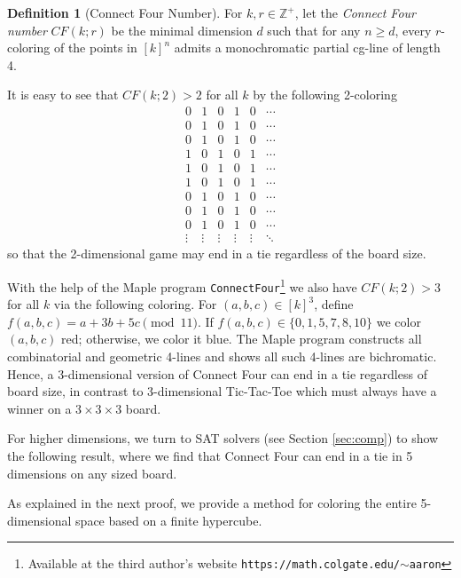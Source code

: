 \documentclass[11pt]{article}
\theoremstyle{definition}
\newtheorem{defn}[thm]{Definition}
\begin{document}
\begin{defn}[Connect Four Number]\label{def24} For $k,r \in \mathbb{Z}^+$, let the {\it Connect Four number} $CF(k;r)$ be
the minimal dimension $d$  such that for any $n \geq d$, every $r$-coloring
of the points in $[k]^n$ admits a monochromatic partial cg-line
of length 4.
\end{defn}

It is easy to see that $CF(k;2)>2$ for all $k$ by the following
2-coloring \small
$$\begin{array}{cccccc}
0&1&0&1&0&\cdots\\
0&1&0&1&0&\cdots\\
0&1&0&1&0&\cdots\\
1&0&1&0&1&\cdots\\
1&0&1&0&1&\cdots\\
1&0&1&0&1&\cdots\\
0&1&0&1&0&\cdots\\
0&1&0&1&0&\cdots\\
0&1&0&1&0&\cdots\\
\vdots&\vdots&\vdots&\vdots&\vdots&\ddots
\end{array}
$$\normalsize
so that the 2-dimensional game may end in a tie regardless of
the board size.  

With the help of the Maple program {\tt ConnectFour}\footnote{Available at the third author's website {\tt https://math.colgate.edu/$\sim$aaron}} we also have $CF(k;2)>3$ for all $k$
via the following coloring.  For $(a,b,c) \in [k]^3$, define
$f(a,b,c)=a+3b+5c \pmod{11}$.  If $f(a,b,c) \in \{0,1,5,7,8,10\}$ we
color $(a,b,c)$ red; otherwise, we color it blue.  The Maple
program constructs all combinatorial and geometric 4-lines 
and shows all such 4-lines are bichromatic.  Hence, a 3-dimensional
version of Connect Four can end in a tie regardless of board size, in contrast to
3-dimensional Tic-Tac-Toe which must always have a winner on a
$3 \times 3 \times 3$ board.


For higher dimensions, we turn to SAT solvers (see Section \ref{sec:comp}) to
show the following result, where we find that Connect Four 
can end in a tie in 5 dimensions on any sized board.

As explained in the next proof, we provide a method
for coloring the entire 5-dimensional space based
on a finite hypercube.
\end{document}
